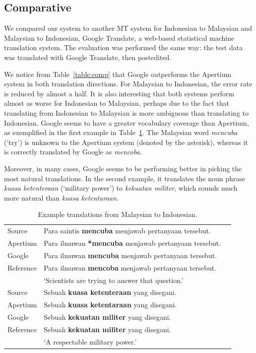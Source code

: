 \documentclass[10pt,a5paper,twoside]{article}
\begin{document}
\subsection{Comparative}
We compared our system to another MT system for Indonesian to Malaysian and Malaysian to Indonesian, Google Translate, a web-based statistical machine translation system. The evaluation was performed the same way: the test data was translated with Google Translate, then postedited.

We notice from Table~\ref{table:comp} that Google outperforms the Apertium system in both translation directions. For Malaysian to Indonesian, the error rate is reduced by almost a half. It is also interesting that both systems perform almost as worse for Indonesian to Malaysian, perhaps due to the fact that translating from Indonesian to Malaysian is more ambiguous than translating to Indonesian. Google seems to have a greater vocabulary coverage than Apertium, as exemplified in the first example in Table~\ref{table:ex}. The Malaysian word \emph{mencuba} (`try') is unknown to the Apertium system (denoted by the asterisk), whereas it is correctly translated by Google as \emph{mencoba}.

Moreover, in many cases, Google seems to be performing better in picking the most natural translations. In the second example, it translates the noun phrase \emph{kuasa ketenteraan} (`military power') to \emph{kekuatan militer}, which sounds much more natural than \emph{kuasa ketentaraan}.

\begin{table}[htbp]
  \begin{center}
  \begin{tabular}{llc}
  \toprule
  Source & Para saintis \textbf{mencuba} menjawab pertanyaan tersebut.\\
  Apertium & Para ilmuwan \textbf{*mencuba} menjawab pertanyaan tersebut.\\
  Google & Para ilmuwan \textbf{mencuba} menjawab pertanyaan tersebut.\\
  Reference & Para ilmuwan \textbf{mencoba} menjawab pertanyaan tersebut.\\
  & `Scientists are trying to answer that question.'\\
  \midrule
  Source & Sebuah \textbf{kuasa ketenteraan} yang disegani.\\
  Apertium & Sebuah \textbf{kuasa ketentaraan} yang disegani.\\
  Google & Sebuah \textbf{kekuatan militer} yang disegani.\\
  Reference & Sebuah \textbf{kekuatan militer} yang disegani.\\
  & `A respectable military power.'\\
  \bottomrule
  \end{tabular}
    \caption{Example translations from Malaysian to Indonesian.}
    \label{table:ex}
  \end{center}
\end{table}
\end{document}
